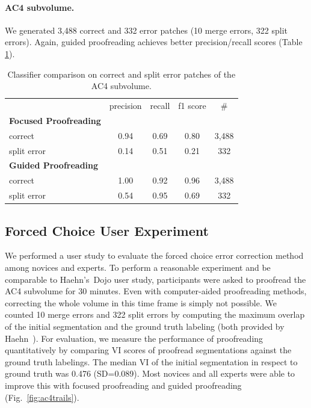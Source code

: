\paragraph{AC4 subvolume.} We generated 3,488 correct and 332 error patches (10 merge errors, 322 split errors). Again, guided proofreading achieves better precision/recall scores (Table \ref{tab:prac4}).

\begin{table}[h]
\caption{Classifier comparison on correct and split error patches of the AC4 subvolume.}%

\small{
\begin{tabular}{l|c|c|c|c}

 & precision & recall & f1 score & \# \\ 
\textbf{Focused Proofreading} & ~ & ~ & ~ & ~ \\ 
correct & 0.94 & 0.69 & 0.80 & 3,488 \\ 
split error & 0.14 & 0.51 & 0.21 & 332 \\ 
\textbf{Guided Proofreading} & ~ & ~ & ~ & ~ \\ 
correct & 1.00 & 0.92 & 0.96 & 3,488 \\ 
split error & 0.54 & 0.95 & 0.69 & 332 \\ 
\end{tabular} 
}
\label{tab:prac4}
\end{table}

\subsection{Forced Choice User Experiment}
We performed a user study to evaluate the forced choice error correction method among novices and experts. To perform a reasonable experiment and be comparable to Haehn's~\etal Dojo user study, participants were asked to proofread the AC4 subvolume for 30 minutes. Even with computer-aided proofreading methods, correcting the whole volume in this time frame is simply not possible. We counted 10 merge errors and 322 split errors by computing the maximum overlap of the initial segmentation and the ground truth labeling (both provided by Haehn~\etal). For evaluation, we measure the performance of proofreading quantitatively by comparing VI scores of proofread segmentations against the ground truth labelings. The median VI of the initial segmentation in respect to ground truth was 0.476 (SD=0.089). Most novices and all experts were able to improve this with focused proofreading and guided proofreading (Fig.~\ref{fig:ac4trails}).

